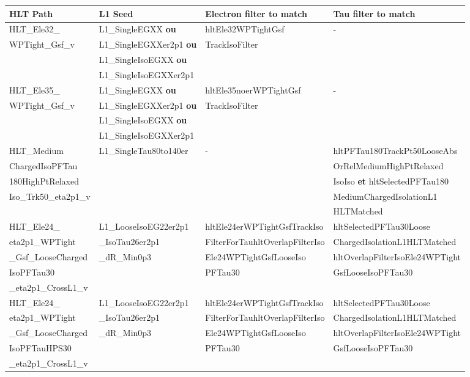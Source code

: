 {\footnotesize
\begin{tabularx}{\textwidth}{llXX}
\toprule
HLT Path & L1 Seed & Electron filter to match & Tau filter to match \\
\midrule
HLT\_Ele32\_
&
L1\_SingleEGXX \textbf{ou}
&
hltEle32WPTightGsf
&
-
\\
WPTight\_Gsf\_v
&
L1\_SingleEGXXer2p1 \textbf{ou}
&
TrackIsoFilter
\\
&
L1\_SingleIsoEGXX \textbf{ou}
\\
&
L1\_SingleIsoEGXXer2p1
\\\hline
HLT\_Ele35\_
&
L1\_SingleEGXX \textbf{ou}
&
hltEle35noerWPTightGsf
&
-
\\
WPTight\_Gsf\_v
&
L1\_SingleEGXXer2p1 \textbf{ou}
&
TrackIsoFilter
\\
&
L1\_SingleIsoEGXX \textbf{ou}
\\
&
L1\_SingleIsoEGXXer2p1
\\\hline
HLT\_Medium
&
L1\_SingleTau80to140er
&
-
&
hltPFTau180TrackPt50LooseAbs
\\
ChargedIsoPFTau
&
&
&
OrRelMediumHighPtRelaxed
\\
180HighPtRelaxed
&
&
&
IsoIso \textbf{et} hltSelectedPFTau180
\\
Iso\_Trk50\_eta2p1\_v
&
&
&
MediumChargedIsolationL1
\\
&
&
&
HLTMatched
\\\hline
HLT\_Ele24\_
&
L1\_LooseIsoEG22er2p1
&
hltEle24erWPTightGsfTrackIso
&
hltSelectedPFTau30Loose
\\
eta2p1\_WPTight
&
\_IsoTau26er2p1
&
FilterForTauhltOverlapFilterIso
&
ChargedIsolationL1HLTMatched\!
\\
\_Gsf\_LooseCharged
&
\_dR\_Min0p3
&
Ele24WPTightGsfLooseIso
&
hltOverlapFilterIsoEle24WPTight\!
\\
IsoPFTau30
&
&
PFTau30
&
GsfLooseIsoPFTau30
\\
\_eta2p1\_CrossL1\_v
\\\hline
HLT\_Ele24\_
&
L1\_LooseIsoEG22er2p1
&
hltEle24erWPTightGsfTrackIso
&
hltSelectedPFTau30Loose
\\
eta2p1\_WPTight
&
\_IsoTau26er2p1
&
FilterForTauhltOverlapFilterIso
&
ChargedIsolationL1HLTMatched\!
\\
\_Gsf\_LooseCharged
&
\_dR\_Min0p3
&
Ele24WPTightGsfLooseIso
&
hltOverlapFilterIsoEle24WPTight\!
\\
IsoPFTauHPS30
&
&
PFTau30
&
GsfLooseIsoPFTau30
\\
\_eta2p1\_CrossL1\_v
\\
\bottomrule
\end{tabularx}
}